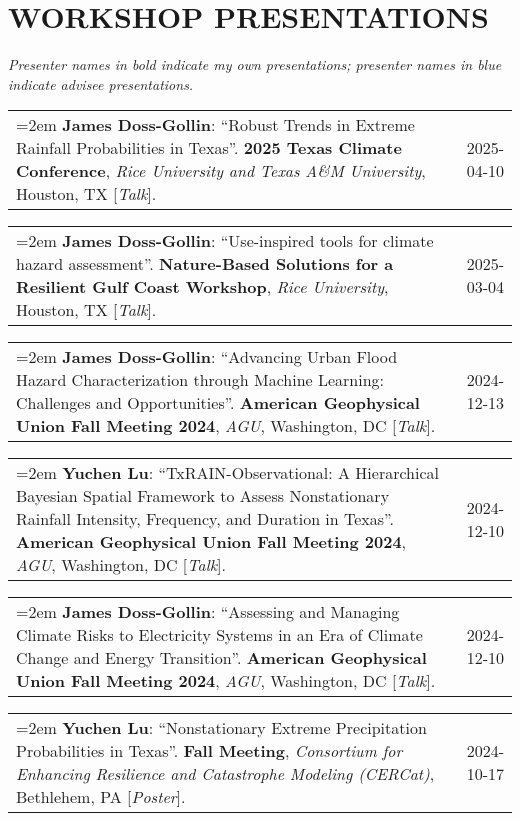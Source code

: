 \documentclass[10pt,oneside]{article}
\makeatletter
\newenvironment{alignedentrieshang}[1][2em]{%
  \noindent%
}{%
}
\newcommand{\hangingitem}[2]{%
  \noindent%
  \begin{tabular*}{\textwidth}{@{}p{0.85\textwidth}@{\extracolsep{\fill}}r@{}}%
    \hangindent=2em \hangafter=1 #1 & #2%
  \end{tabular*}%
}
\makeatother
\begin{document}

\section{WORKSHOP PRESENTATIONS}

\textit{Presenter names in bold indicate my own presentations; presenter names in \textcolor{RiceBlue}{blue} indicate advisee presentations.}

\bigskip

\begin{alignedentrieshang}


\hangingitem{\textbf{James Doss-Gollin}: \enquote{Robust Trends in Extreme Rainfall Probabilities in Texas}. \textbf{2025 Texas Climate Conference}, \textit{Rice University and Texas A\&M University}, Houston, TX [\textit{Talk}].}{2025-04-10}



\hangingitem{\textbf{James Doss-Gollin}: \enquote{Use-inspired tools for climate hazard assessment}. \textbf{Nature-Based Solutions for a Resilient Gulf Coast Workshop}, \textit{Rice University}, Houston, TX [\textit{Talk}].}{2025-03-04}



\hangingitem{\textbf{James Doss-Gollin}: \enquote{Advancing Urban Flood Hazard Characterization through Machine Learning: Challenges and Opportunities}. \textbf{American Geophysical Union Fall Meeting 2024}, \textit{AGU}, Washington, DC [\textit{Talk}].}{2024-12-13}



\hangingitem{\textcolor{RiceBlue}{\textbf{Yuchen Lu}}: \enquote{TxRAIN-Observational: A Hierarchical Bayesian Spatial Framework to Assess Nonstationary Rainfall Intensity, Frequency, and Duration in Texas}. \textbf{American Geophysical Union Fall Meeting 2024}, \textit{AGU}, Washington, DC [\textit{Talk}].}{2024-12-10}



\hangingitem{\textbf{James Doss-Gollin}: \enquote{Assessing and Managing Climate Risks to Electricity Systems in an Era of Climate Change and Energy Transition}. \textbf{American Geophysical Union Fall Meeting 2024}, \textit{AGU}, Washington, DC [\textit{Talk}].}{2024-12-10}



\hangingitem{\textcolor{RiceBlue}{\textbf{Yuchen Lu}}: \enquote{Nonstationary Extreme Precipitation Probabilities in Texas}. \textbf{Fall Meeting}, \textit{Consortium for Enhancing Resilience and Catastrophe Modeling (CERCat)}, Bethlehem, PA [\textit{Poster}].}{2024-10-17}




\end{alignedentrieshang}
\end{document}
